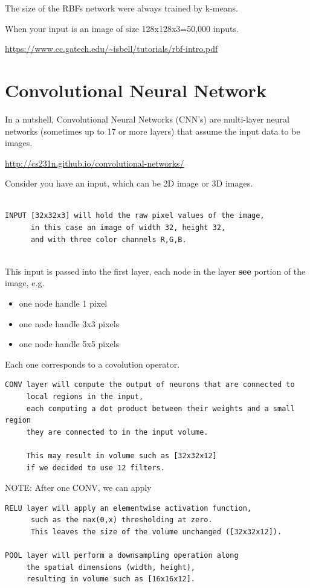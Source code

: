 The size of the RBFs network were always trained by k-means.


When your input is an image of size 128x128x3=50,000 inputs.

\url{https://www.cc.gatech.edu/~isbell/tutorials/rbf-intro.pdf}


\section{Convolutional Neural Network}
\label{sec:convolutional-neural-network}


In a nutshell, Convolutional Neural Networks (CNN's) are multi-layer neural
networks (sometimes up to 17 or more layers) that assume the input data to be
images. 

\url{http://cs231n.github.io/convolutional-networks/}


Consider you have an input, which can be 2D image or 3D images. 
\begin{verbatim}

INPUT [32x32x3] will hold the raw pixel values of the image, 
      in this case an image of width 32, height 32, 
      and with three color channels R,G,B.


\end{verbatim}

This input is
passed into the first layer, each node in the layer {\bf see} portion of the image, e.g.
\begin{itemize}
  \item one node handle 1 pixel
  
  \item one node handle 3x3 pixels 
  
  \item one node handle 5x5 pixels
\end{itemize}
Each one corresponds to a covolution operator.

\begin{verbatim}
CONV layer will compute the output of neurons that are connected to 
     local regions in the input, 
     each computing a dot product between their weights and a small region 
     they are connected to in the input volume. 
     
     This may result in volume such as [32x32x12] 
     if we decided to use 12 filters.

\end{verbatim}

NOTE: After one CONV, we can apply
\begin{verbatim}
RELU layer will apply an elementwise activation function, 
      such as the max(0,x) thresholding at zero. 
      This leaves the size of the volume unchanged ([32x32x12]).

POOL layer will perform a downsampling operation along 
     the spatial dimensions (width, height), 
     resulting in volume such as [16x16x12].

\end{verbatim}

